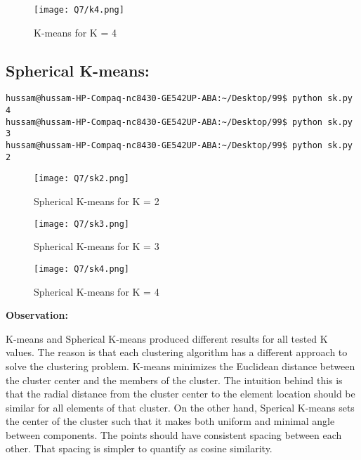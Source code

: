 \pagebreak

\begin{figure}[h]
\caption{K-means for K = 4}
\centering
\texttt{[image: Q7/k4.png]}
\end{figure}

\pagebreak

\subsection{Spherical K-means:}



\begin{lstlisting}[breakatwhitespace=〈false)]
hussam@hussam-HP-Compaq-nc8430-GE542UP-ABA:~/Desktop/99$ python sk.py 4
hussam@hussam-HP-Compaq-nc8430-GE542UP-ABA:~/Desktop/99$ python sk.py 3
hussam@hussam-HP-Compaq-nc8430-GE542UP-ABA:~/Desktop/99$ python sk.py 2
\end{lstlisting}

\pagebreak

\begin{figure}[h]
\caption{Spherical K-means for K = 2}
\centering
\texttt{[image: Q7/sk2.png]}
\end{figure}

\pagebreak

\begin{figure}[h]
\caption{Spherical K-means for K = 3}
\centering
\texttt{[image: Q7/sk3.png]}
\end{figure}

\pagebreak

\begin{figure}[h]
\caption{Spherical K-means for K = 4}
\centering
\texttt{[image: Q7/sk4.png]}
\end{figure}

\pagebreak


\textbf{Observation:}

K-means and Spherical K-means produced different results for all tested K values. The reason is that each clustering algorithm has a different approach to solve the clustering problem. K-means minimizes the Euclidean distance between the cluster center and the members of the cluster. The intuition behind this is that the radial distance from the cluster center to the element location should be similar for all elements of that cluster. On the other hand, Sperical K-means sets the center of the cluster such that it makes both uniform and minimal angle between components. The points should have consistent spacing between each other. That spacing is simpler to quantify as cosine similarity. 